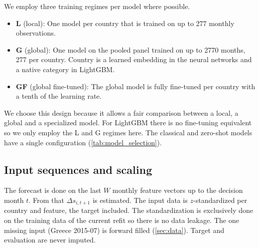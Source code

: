 We employ three training regimes per model where possible.
\begin{itemize}
  \item \textbf{L} (local): One model per country that is trained on up to 277 monthly observations.
  \item \textbf{G} (global): One model on the pooled panel trained on up to 2770 months, 277 per country. Country is a learned embedding in the neural networks and a native category in LightGBM.
  \item \textbf{GF} (global fine-tuned): The global model is fully fine-tuned per country with a tenth of the learning rate.
\end{itemize}
We choose this design because it allows a fair comparison between a local, a global and a specialized model. For LightGBM there is no fine-tuning equivalent so we only employ the L and G regimes here. The classical and zero-shot models have a single configuration (\cref{tab:model_selection}).

\subsection{Input sequences and scaling}
\label{sec:exp:sequences}


The forecast is done on the last $W$ monthly feature vectors up to the decision month $t$. From that $\Delta s_{i,t+1}$ is estimated. The input data is $z$-standardized per country and feature, the target included. The standardization is exclusively done on the training data of the current refit so there is no data leakage. The one missing input (Greece 2015-07) is forward filled (\cref{sec:data}). Target and evaluation are never imputed.





